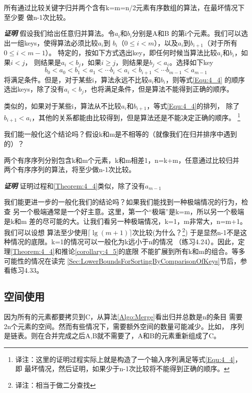 \begin{theorem}\label{Theorem:4_4}
所有通过比较关键字归并两个含有k=m=n/2元素有序数组的算法，在最坏情况下至少要
做n-1次比较。

{\textbf{\emph{证明}}}  假设我们给出任意归并算法。令$a_i$和$b_i$分别是A和B
的第i个元素。我们可以选出一组keys，使得算法必须比较$a_i$到
$b_i$（$0\leq i<m$），以及$a_i$到$b_{i+1}$（对于所有$0\leq i<m-1$）。
特定的，按如下方式选出key，即任何时候当算法比较$a_i$和$b_i$，如果$i<j$，
则结果是$a_i<b_j$，如果$i\geq j$，则结果是$b_j<a_i$。选择如下key
\begin{equation}\label{Equ:4_4}
b_0<a_0<b_1<a_1<\cdots b_i<a_i<b_{i+1}<\cdots b_{m-1}<a_{m-1}
\end{equation}
将满足条件。但是，对于某些i，算法永远不比较$a_i$和$b_i$，则等式\ref{Equ:4_4}
的顺序选出keys，除了没有$a_i<b_j$，也将满足条件，但是算法不能得到正确的顺序。

类似的，如果对于某些i，算法从不比较$a_i$和$b_{i+1}$，等式\ref{Equ:4_4}的排列，
除了$b_{i+1}<a_i$，其他的关系都能由比较得到，但是算法还是不能决定正确的顺序。
\footnote{译注：这里的证明过程实际上就是构造了一个输入序列满足等式\ref{Equ:4_4}，即
最坏情况，然后证明，如果少于n-1次比较将不能得到正确的顺序。}
\end{theorem}

我们能一般化这个结论吗？假设k和m是不相等的（就像我们在归并排序中遇到的）？

\begin{corollary}\label{corollary:4_5}
两个有序序列分别包含k和m个元素，k和m相差1，n=k+m，任意通过比较归并
两个有序序列的算法，将至少做n-1次比较。

{\textbf{\emph{证明}}} 证明过程和\ref{Theorem:4_4}类似，除了没有$a_{m-1}$
\end{corollary}

我们能更进一步的一般化我们的结论吗？如果我们能找到一种极端情况的行为，检查
另一个极端通常是一个好主意。这里，第一个“极端”是k=m，所以另一个极端是k和m
差的尽可能的大。让我们看另一种极端情况，k=1，m非常大，n=m+1。我们可以设想
算法至少使用$\lceil\lg(m+1)\rceil$次比较(为什么？\footnote{译注：相当于做二分查找})
于是显然n-1不是这种情况的底限。k=1的情况可以一般化为k远小于n的情况
（练习4.24）。因此，定理\ref{Theorem:4_4}和推论\ref{corollary:4_5}的底限
不能扩展到所有k和m的组合。等多可能性的情况在读完
\ref{Sec:LowerBoundsForSortingByComparisonOfKeys}节后，参看练习4.33。

\subsection{空间使用}\label{Sec:MergeSpaceUsage}
因为所有的元素都要拷贝到C，从算法\ref{Algo:Merge}看出归并总数是n的条目
需要2n个元素的空间。然而有些情况下，需要额外空间的数量可能减少。比如，
序列是链表。则在合并完成之后A,B就不需要了，A和B的元素重新组成了C。

